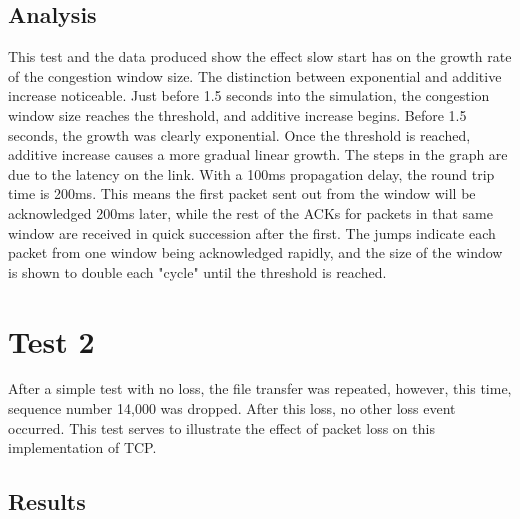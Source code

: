 \documentclass[fleqn,11pt]{article}
\begin{document}
	\subsection{Analysis}
	
	This test and the data produced show the effect slow start has on the growth rate
	of the congestion window size. The distinction between exponential and additive increase
	noticeable. Just before 1.5 seconds into the simulation, the congestion window size reaches
	the threshold, and additive increase begins. Before 1.5 seconds, the growth was clearly
	exponential. Once the threshold is reached, additive increase causes a more gradual linear
	growth. The steps in the graph are due to the latency on the link. With a 100ms propagation
	delay, the round trip time is 200ms. This means the first packet sent out from the window
	will be acknowledged 200ms later, while the rest of the ACKs for packets in that same window
	are received in quick succession after the first. The jumps indicate each packet from one window
	being acknowledged rapidly, and the size of the window is shown to double each "cycle" until the
	threshold is reached.
	
	\section{Test 2}
	
	After a simple test with no loss, the file transfer was repeated, however, this time,
	sequence number 14,000 was dropped. After this loss, no other loss event occurred. This
	test serves to illustrate the effect of packet loss on this implementation of TCP.
	
	
	\subsection{Results}
	
\end{document}
